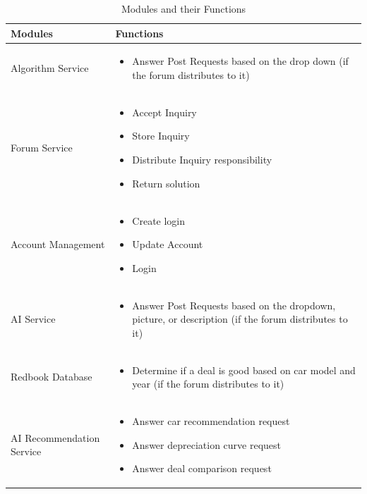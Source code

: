 \documentclass[]{article}
\begin{document}
\begin{itemize}
	\begin{table}[h!]
    \centering
    \renewcommand{\arraystretch}{1.5}
    \begin{tabular}{|p{4cm}|p{10cm}|}
        \hline
        \textbf{Modules} & \textbf{Functions} \\
        \hline
        Algorithm Service & 
         \begin{minipage}{10cm}\begin{itemize}
            \item Answer Post Requests based on the drop down (if the forum distributes to it)
        \end{itemize}\end{minipage} \\
        \hline
        Forum Service & 
        \begin{itemize}
            \item Accept Inquiry
            \item Store Inquiry
            \item Distribute Inquiry responsibility
            \item Return solution
        \end{itemize} \\
        \hline
        Account Management & 
        \begin{itemize}
            \item Create login
            \item Update Account
            \item Login
        \end{itemize} \\
        \hline
        AI Service & 
        \begin{itemize}
            \item Answer Post Requests based on the dropdown, picture, or description (if the forum distributes to it)
        \end{itemize} \\
        \hline
        Redbook Database & 
        \begin{minipage}{10cm}\begin{itemize}
            \item Determine if a deal is good based on car model and year (if the forum distributes to it)
        \end{itemize}\end{minipage} \\
        \hline
        AI Recommendation Service & 
        \begin{itemize}
            \item Answer car recommendation request
            \item Answer depreciation curve request
            \item Answer deal comparison request
        \end{itemize} \\
        \hline
    \end{tabular}
    \caption{Modules and their Functions}
\end{table}
\end{itemize}
\pagebreak
\end{document}

